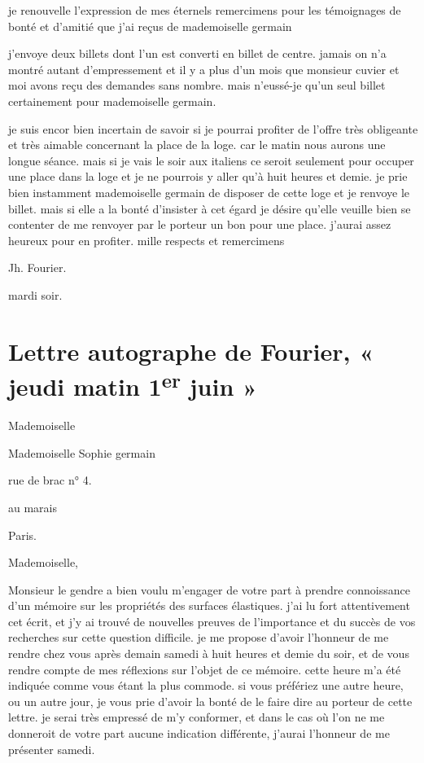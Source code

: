 \documentclass[11pt,a4paper]{article}
\begin{document}
je renouvelle l'expression de mes éternels remercimens pour les témoignages de
bonté et d'amitié que j'ai reçus de mademoiselle germain

j'envoye deux billets dont l'un est converti en billet de centre. jamais on n'a
montré autant d'empressement et il y a plus d'un mois que monsieur cuvier et
moi avons reçu des demandes sans nombre. mais n'eussé-je qu'un seul billet
\ill{} certainement pour mademoiselle germain.


je suis encor bien incertain de savoir si je pourrai profiter de l'offre très
obligeante et très aimable concernant la place de la loge. car le matin nous
aurons une longue séance. mais si je vais le soir aux italiens ce seroit
seulement pour occuper une place dans la loge et je ne pourrois y aller qu'à
huit heures et demie. je prie bien instamment mademoiselle germain de disposer
de cette loge et je renvoye le billet. mais si elle a la bonté d'insister à
cet égard je désire qu'elle veuille bien se contenter de me renvoyer par le
porteur un bon pour une place. j'aurai  assez heureux pour en
profiter. mille respects et  remercimens

Jh. Fourier.

mardi soir.


\section{Lettre autographe de Fourier, « jeudi matin 1\textsuperscript{er} juin »}

Mademoiselle

Mademoiselle Sophie germain

rue de brac n° 4.

au marais

Paris.


Mademoiselle,

Monsieur le gendre a bien voulu m'engager de votre part à prendre connoissance
d'un mémoire sur les propriétés des surfaces élastiques. j'ai lu fort
attentivement cet écrit, et j'y ai trouvé de nouvelles preuves de l'importance
et du succès de vos recherches sur cette question difficile. je me propose
d'avoir l'honneur de me rendre chez vous après demain samedi à huit heures et
demie du soir, et de vous rendre compte de mes réflexions sur l'objet de ce
mémoire. cette heure m'a été indiquée comme vous étant la plus commode. si
vous préfériez une autre heure, ou un autre jour, je vous prie d'avoir la bonté
de le faire dire au porteur de cette lettre. je serai très empressé de m'y
conformer, et dans le cas où l'on ne me donneroit de votre part aucune
indication différente, j'aurai l'honneur de me présenter samedi.
\end{document}
